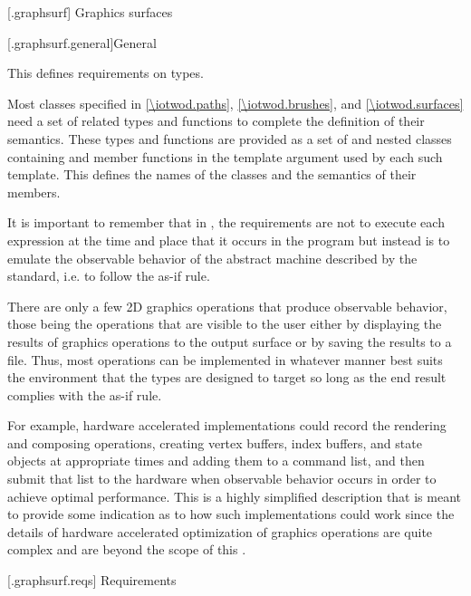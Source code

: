
 [\iotwod.graphsurf] {Graphics surfaces}

 [\iotwod.graphsurf.general]{General}

\pnum
This \clause{} defines requirements on \term{\graphicssurfacestemplparamnospace} types.

\pnum
Most classes specified in \ref{\iotwod.paths}, \ref{\iotwod.brushes}, and \ref{\iotwod.surfaces} need a set of related types and functions to complete the definition of their semantics. These types and functions are provided as a set of  and nested classes containing  and  member functions in the template argument \tcode{\graphicssurfacestemplparamnospace} used by each such template. This \clause{} defines the names of the classes and the semantics of their members.

\pnum
\begin{note}
It is important to remember that in \Cpp{}, the requirements are not to execute each expression at the time and place that it occurs in the program but instead is to emulate the observable behavior of the abstract machine described by the \Cpp{} standard, i.e. to follow the as-if rule. 

\pnum
There are only a few 2D graphics operations that produce observable behavior, those being the operations that are visible to the user either by displaying the results of graphics operations to the output surface or by saving the results to a file. Thus, most operations can be implemented in whatever manner best suits the environment that the \graphicssurfacestemplparamnospace{} types are designed to target so long as the end result complies with the as-if rule.

\pnum
For example, hardware accelerated implementations could record the rendering and composing operations, creating vertex buffers, index buffers, and state objects at appropriate times and adding them to a command list, and then submit that list to the hardware when observable behavior occurs in order to achieve optimal performance. This is a highly simplified description that is meant to provide some indication as to how such implementations could work since the details of hardware accelerated optimization of graphics operations are quite complex and are beyond the scope of this \documenttypename{}.
\end{note}

 [\iotwod.graphsurf.reqs] {Requirements}









